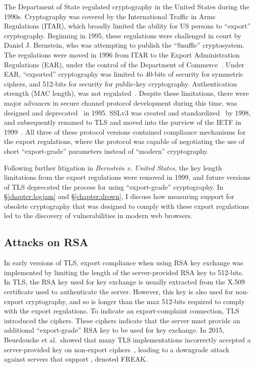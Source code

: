 The Department of State regulated cryptography in the United States during
the 1990s. Cryptography was covered by the International Traffic in Arms
Regulations (ITAR), which broadly limited the ability for US persons to
``export'' cryptography. Beginning in 1995, these regulations were challenged
in court by Daniel J. Bernstein, who was attempting to publish the
``Snuffle'' cryptosystem. The regulations were moved in 1996 from ITAR to the
Export Administration Regulations (EAR), under the control of the Department
of Commerce~\cite{djb-case-status}. Under EAR, ``exported'' cryptography was
limited to 40-bits of security for symmetric ciphers, and 512-bits for
security for public-key cryptography. Authentication strength (\eg MAC
length), was not regulated~\cite{ear-2001-cat-5}. Despite these limitations,
there were major advances in secure channel protocol development during this time.
\ssltwo was designed and deprecated~\cite{sslv2} in 1995. SSLv3 was created and
standardized~\cite{rfc6101} by 1998, and subsequently renamed to TLS and
moved into the purview of the IETF in 1999~\cite{rfc2246}. All three of these
protocol versions contained compliance mechanisms for the export regulations,
where the protocol was capable of negotiating the use of short
``export-grade'' parameters instead of ``modern'' cryptography.

Following further litigation in \textit{Bernstein v. United States}, the key
length limitations from the export regulations were removed in 1999, and
future versions of TLS deprecated the process for using ``export-grade''
cryptography. In \S\ref{chapter:logjam} and \S\ref{chapter:drown}, I discuss
how measuring support for obsolete cryptography that was designed to comply
with these export regulations led to the discovery of vulnerabilities in
modern web browsers.

\subsection{Attacks on RSA}

In early versions of TLS, export compliance when using RSA key exchange was
implemented by limiting the length of the server-provided RSA key to
512-bits. In TLS, the RSA key used for key exchange is usually extracted from
the X.509 certificate used to authenticate the server. However, this key is
also used for non-export cryptography, and so is longer than the max 512-bits
required to comply with the export regulations. To indicate an
export-complaint connection, TLS introduced the \rsaexp{} ciphers. These
ciphers indicate that the server must provide an additional ``export-grade''
RSA key to be used for key exchange. In 2015, Beurdouche et al.\ showed that
many TLS implementations incorrectly accepted a server-provided \rsaexp{} key
on non-export \rsa{} ciphers~\cite{freak-attack-2015}, leading to a downgrade
attack against servers that support \rsaexp{}, denoted FREAK.

